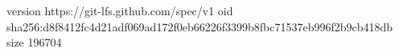 version https://git-lfs.github.com/spec/v1
oid sha256:d8f8412fc4d21adf069ad172f0eb66226f3399b8fbc71537eb996f2b9cb418db
size 196704
